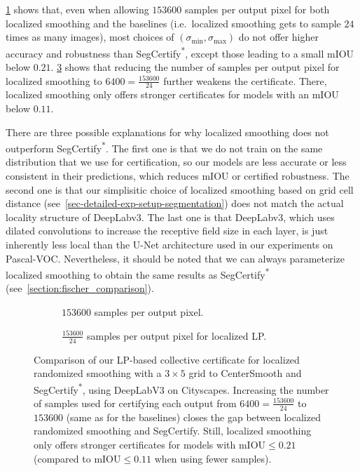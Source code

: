 \cref{fig:cityscapes_more_samples} shows that, even when allowing $153600$ samples per output pixel for both localized smoothing and the baselines (i.e.\ localized smoothing gets to sample $24$ times as many images), most choices of $(\sigma_\mathrm{min}, \sigma_\mathrm{max})$ do not offer higher accuracy and robustness than   SegCertify\textsuperscript{*}, except those leading to a small mIOU below $0.21$.
\cref{fig:cityscapes_few_samples} shows that reducing the number of samples per output pixel for localized smoothing to $6400 = \frac{153600}{24}$ further weakens the certificate. There, localized smoothing only offers stronger certificates for models with an mIOU below $0.11$.

There are three possible explanations for why localized smoothing does not outperform SegCertify\textsuperscript{*}.
The first one is that we do not train on the same distribution that we use for certification, so our models are less accurate or less consistent in their predictions, which reduces mIOU or certified robustness.
The second one is that our simplisitic choice of localized smoothing based on grid cell distance (see~\autoref{sec-detailed-exp-setup-segmentation}) does not match the actual locality structure of DeepLabv3.
The last one is that DeepLabv3, which uses dilated convolutions to increase the receptive field size in each layer, is just inherently less local than the U-Net architecture used in our experiments on Pascal-VOC.
Nevertheless, it should be noted that we can always parameterize localized smoothing to obtain the same results as SegCertify\textsuperscript{*} (see~\cref{section:fischer_comparison}).

\begin{figure}[t!]
    \vskip 0.2in
    \centering
    \begin{subfigure}[b]{0.49\textwidth}
        \resizebox{\textwidth}{!}{}
        \caption{$153600$ samples per output pixel.}
        \label{fig:cityscapes_more_samples}
    \end{subfigure}
    \hfill
    \begin{subfigure}[b]{0.49\textwidth}
        \resizebox{\textwidth}{!}{}
        \caption{$\frac{153600}{24}$ samples per output pixel for localized LP.}
        \label{fig:cityscapes_few_samples}
    \end{subfigure}
    \caption{Comparison of our LP-based collective certificate for localized randomized smoothing with a $3 \times 5$ grid to CenterSmooth and SegCertify\textsuperscript{*}, using DeepLabV3 on Cityscapes.
    Increasing the number of samples used for certifying each output from $6400 = \frac{153600}{24}$ to $153600$ (same as for the baselines) closes the gap between localized randomized smoothing and SegCertify.
    Still, localized smoothing only offers stronger certificates for models with $\mathrm{mIOU} \leq 0.21$ (compared to $\mathrm{mIOU} \leq 0.11$ when using fewer samples).}
\end{figure}

